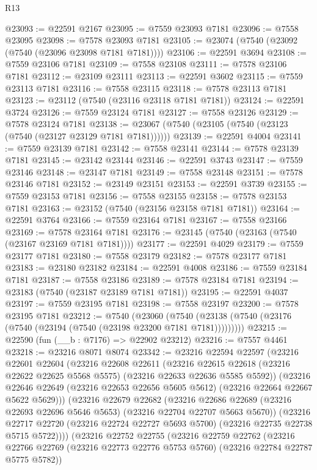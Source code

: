 \begin{lexlean}{R13}
\begin{coremodule}
@23093 := @22591 @2167
@23095 := @7559 @23093 @7181
@23096 := @7558 @23095
@23098 := @7578 @23093 @7181
@23105 := @23074 (@7540 (@23092 (@7540 (@23096 @23098 @7181 @7181))))
@23106 := @22591 @3694
@23108 := @7559 @23106 @7181
@23109 := @7558 @23108
@23111 := @7578 @23106 @7181
@23112 := @23109 @23111
@23113 := @22591 @3602
@23115 := @7559 @23113 @7181
@23116 := @7558 @23115
@23118 := @7578 @23113 @7181
@23123 := @23112 (@7540 (@23116 @23118 @7181 @7181))
@23124 := @22591 @3724
@23126 := @7559 @23124 @7181
@23127 := @7558 @23126
@23129 := @7578 @23124 @7181
@23138 := @23067 (@7540 (@23105 (@7540 (@23123 (@7540 (@23127 @23129 @7181 @7181))))))
@23139 := @22591 @4004
@23141 := @7559 @23139 @7181
@23142 := @7558 @23141
@23144 := @7578 @23139 @7181
@23145 := @23142 @23144
@23146 := @22591 @3743
@23147 := @7559 @23146
@23148 := @23147 @7181
@23149 := @7558 @23148
@23151 := @7578 @23146 @7181
@23152 := @23149 @23151
@23153 := @22591 @3739
@23155 := @7559 @23153 @7181
@23156 := @7558 @23155
@23158 := @7578 @23153 @7181
@23163 := @23152 (@7540 (@23156 @23158 @7181 @7181))
@23164 := @22591 @3764
@23166 := @7559 @23164 @7181
@23167 := @7558 @23166
@23169 := @7578 @23164 @7181
@23176 := @23145 (@7540 (@23163 (@7540 (@23167 @23169 @7181 @7181))))
@23177 := @22591 @4029
@23179 := @7559 @23177 @7181
@23180 := @7558 @23179
@23182 := @7578 @23177 @7181
@23183 := @23180 @23182
@23184 := @22591 @4008
@23186 := @7559 @23184 @7181
@23187 := @7558 @23186
@23189 := @7578 @23184 @7181
@23194 := @23183 (@7540 (@23187 @23189 @7181 @7181))
@23195 := @22591 @4037
@23197 := @7559 @23195 @7181
@23198 := @7558 @23197
@23200 := @7578 @23195 @7181
@23212 := @7540
    (@23060 (@7540 (@23138 (@7540 (@23176 (@7540 (@23194 (@7540 (@23198 @23200 @7181 @7181)))))))))
@23215 := @22590 (fun (__b : @7176) => @22902 @23212)
@23216 := @7557 @4461
@23218 := @23216 @8071 @8074
@23342 := @23216
    @22594
    @22597
    (@23216
      @22601
      @22604
      (@23216
        @22608
        @22611
        (@23216 @22615 @22618 (@23216 @22622 @22625 @5568 @5575) (@23216 @22633 @22636 @5585 @5592))
        (@23216
          @22646
          @22649
          (@23216 @22653 @22656 @5605 @5612)
          (@23216 @22664 @22667 @5622 @5629)))
      (@23216
        @22679
        @22682
        (@23216 @22686 @22689 (@23216 @22693 @22696 @5646 @5653) (@23216 @22704 @22707 @5663 @5670))
        (@23216
          @22717
          @22720
          (@23216 @22724 @22727 @5693 @5700)
          (@23216 @22735 @22738 @5715 @5722))))
    (@23216
      @22752
      @22755
      (@23216
        @22759
        @22762
        (@23216 @22766 @22769 (@23216 @22773 @22776 @5753 @5760) (@23216 @22784 @22787 @5775 @5782))

\end{coremodule}
\end{lexlean}
